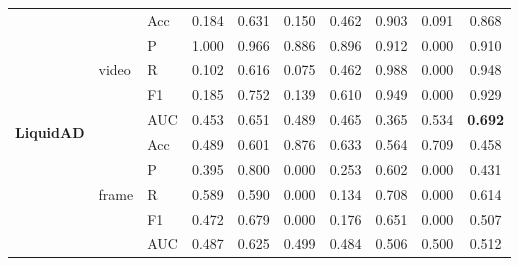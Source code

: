 \documentclass[runningheads]{llncs}
\begin{document}
\begin{table}[t]
{\begin{tabular}{lll cc cc cc c}
\multirow{10}{*}{\textbf{LiquidAD}} & \multirow{5}{*}{video}
  & Acc & 0.184 & 0.631 & 0.150 & 0.462 & \cellcolor{cellRed}0.903 & 0.091 & \cellcolor{cellRedLight}0.868 \\
& & P   & \cellcolor{cellRed}1.000 & \cellcolor{cellRedLight}0.966 & 0.886 & 0.896 & 0.912 & 0.000 & 0.910 \\
& & R   & 0.102 & 0.616 & 0.075 & 0.462 & \cellcolor{cellRed}0.988 & 0.000 & \cellcolor{cellRedLight}0.948 \\
& & F1  & 0.185 & 0.752 & 0.139 & 0.610 & \cellcolor{cellRed}0.949 & 0.000 & \cellcolor{cellRedLight}0.929 \\
& & AUC & 0.453 & \cellcolor{cellRedLight}0.651 & 0.489 & 0.465 & 0.365 & 0.534 & \cellcolor{cellRed}\textbf{0.692} \\
\cline{2-10}
& \multirow{5}{*}{frame}
  & Acc & 0.489 & 0.601 & \cellcolor{cellBlue}0.876 & 0.633 & 0.564 & \cellcolor{cellBlueLight}0.709 & 0.458 \\
& & P   & 0.395 & \cellcolor{cellBlue}0.800 & 0.000 & 0.253 & \cellcolor{cellBlueLight}0.602 & 0.000 & 0.431 \\
& & R   & 0.589 & 0.590 & 0.000 & 0.134 & \cellcolor{cellBlue}0.708 & 0.000 & \cellcolor{cellBlueLight}0.614 \\
& & F1  & 0.472 & \cellcolor{cellBlue}0.679 & 0.000 & 0.176 & \cellcolor{cellBlueLight}0.651 & 0.000 & 0.507 \\
& & AUC & 0.487 & \cellcolor{cellBlue}0.625 & 0.499 & 0.484 & 0.506 & 0.500 & \cellcolor{cellBlueLight}0.512 \\
\midrule


\end{tabular}}
\end{table}
\end{document}
